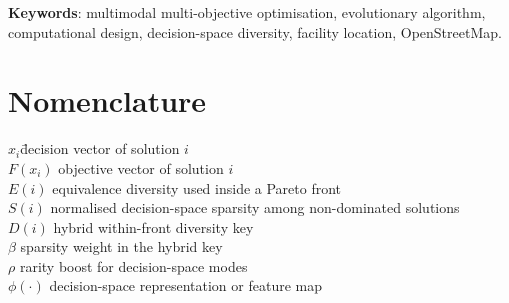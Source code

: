 \documentclass[12pt,a4paper]{article}
\renewcommand{\_}{\textunderscore\allowbreak}
\begin{document}
\begin{abstract}
Computational design often requires several distinct solutions with comparable trade-offs, rather
than a single Pareto set. Emergency-facility placement is one example: station layouts can be
equivalent in mean and worst-case access while differing substantially in geography. Multimodal
multi-objective optimisation formalises this requirement, but standard selection pressure often
collapses equivalent decision regions. This study shows that the location of the decision-space
diversity signal is the key design choice. In a Pareto-based evolutionary algorithm, sparsity
should be used as a non-negative \emph{within-front} selection term and kept out of the dominance
sort. This separates convergence, carried by rank, from decision-space coverage, carried by
tie-breaking inside the splitting front. A controlled study that fixes the backbone and sparsity
signal shows that within-front placement outperforms in-sort fusion. Multiplicative and additive
within-front forms are statistically similar, indicating that placement rather than algebraic form
carries the effect. The principle is implemented in an equivalence-aware evolutionary framework
with archives, adaptive niching and an operator portfolio. Benchmarks, scalable families and a
deceptive counter-regime define where the method is effective. In a five-city OpenStreetMap
facility-placement case study, the method returns geographically distinct layouts with
near-equivalent access trade-offs. The method is not favoured when diversity comes from deceptive
local Pareto sets rather than equivalent global optima. All baselines, protocols, seeds and
statistics are released.
\end{abstract}

\textbf{Keywords}: multimodal multi-objective optimisation, evolutionary algorithm,
computational design, decision-space diversity, facility location, OpenStreetMap.

\section*{Nomenclature}

\begin{tabbing}
$x_i$\qquad \= decision vector of solution $i$\\
$F(x_i)$ \> objective vector of solution $i$\\
$E(i)$ \> equivalence diversity used inside a Pareto front\\
$S(i)$ \> normalised decision-space sparsity among non-dominated solutions\\
$D(i)$ \> hybrid within-front diversity key\\
$\beta$ \> sparsity weight in the hybrid key\\
$\rho$ \> rarity boost for decision-space modes\\
$\phi(\cdot)$ \> decision-space representation or feature map
\end{tabbing}
\end{document}
